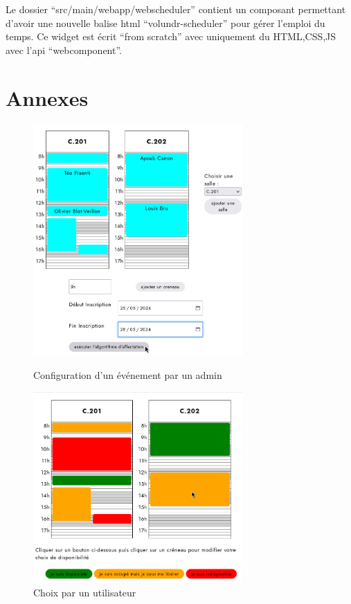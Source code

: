 \documentclass[french]{article}
\begin{document}
Le dossier ``src/main/webapp/webscheduler'' contient un composant
permettant d'avoir une nouvelle balise html ``volundr-scheduler'' pour
gérer l'emploi du temps. Ce widget est écrit ``from scratch'' avec
uniquement du HTML,CSS,JS avec l'api ``webcomponent''.

\newpage

\section{Annexes}

    \begin{figure}[h]
        \centering
        \includegraphics[width=8cm]{rapport/modif_event.png}
        \caption{Configuration d'un événement par un admin}
        \label{fig:modif_event}

        \centering
        \includegraphics[width=8cm]{rapport/choix_creneau.png}
        \caption{Choix par un utilisateur}
        \label{fig:choix_util}
    \end{figure}
\end{document}

